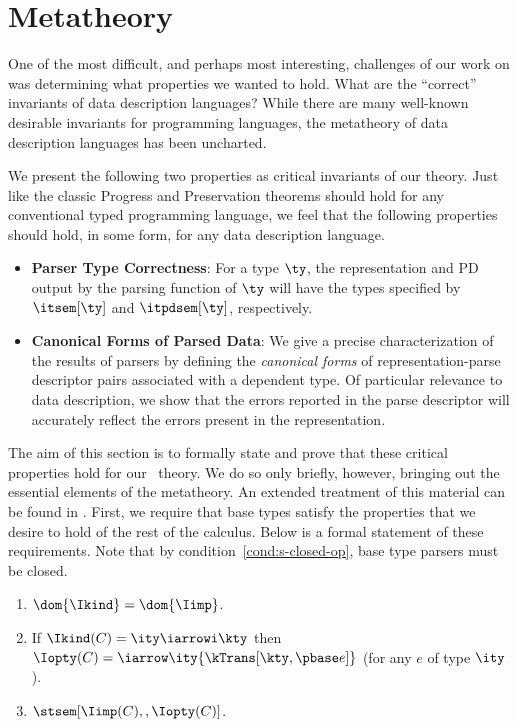 \section{Metatheory}
\label{sec:ddc-meta-theory}

One of the most difficult, and perhaps most interesting, challenges of our
work on \ddc{} was determining what
properties we wanted to hold. What are the ``correct''
invariants of data description languages? While there are many
well-known desirable invariants for programming languages, the
metatheory of data description languages has been
uncharted.

We present the following two properties as critical invariants of
our theory.  Just like the classic Progress and Preservation theorems
should hold for any conventional typed programming language,
we feel that the following properties should hold, in some form, for any data
description language.
\begin{itemize}
\item {\bf Parser Type Correctness}: For a \ddc{} type $\ty$, the
  representation and PD output by the parsing function of $\ty$ will
  have the types specified by $\itsem[\ty]$ and
  $\itpdsem[\ty]$, respectively.
  
\item {\bf Canonical Forms of Parsed Data}: We give a precise
  characterization of the results of parsers by defining the {\em
    canonical forms} of representation-parse descriptor pairs
  associated with a dependent \ddc{} type. Of particular relevance to
  data description, we show that the errors reported in the parse
  descriptor will accurately reflect the errors present in the
  representation.
\end{itemize}

The aim of this section is to formally state and prove that these
critical properties hold for our \ddc\ theory. We do so only briefly, however, bringing out the essential elements of the metatheory.  An extended treatment of this material can be found in . First, we require that \ddc{} base types satisfy the properties that we
desire to hold of the rest of the calculus.  Below is a formal
statement of these requirements. Note that by
condition~\ref{cond:s-closed-op}, base type parsers must be closed.
\begin{condition}
\label{cond:s-base-types}
  \begin{enumerate}
  \item $\dom {\Ikind} = \dom {\Iimp}$.
  \item If $\Ikind(C) = {\ity \iarrowi \kty}$ then $\Iopty(C) =
    \iarrow \ity {\kTrans[\kty,\pbase e]}$ (for any $e$ of type $\ity$).
  \item $\stsem[\Iimp(C),,\Iopty(C)]$.
    \label{cond:s-closed-op}
  \end{enumerate}
\end{condition}

